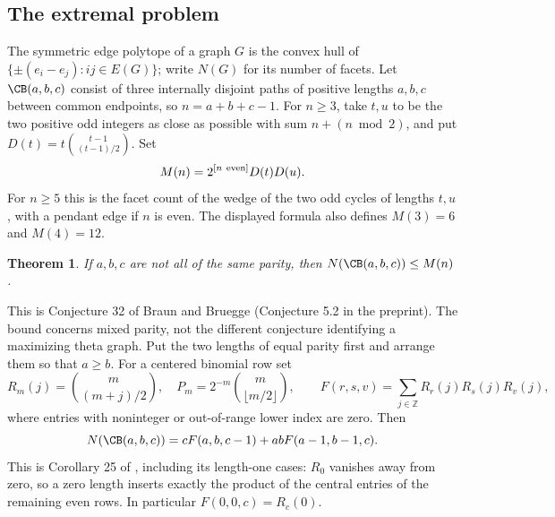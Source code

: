\documentclass[11pt,a4paper]{article}
\numberwithin{equation}{section}
\newtheorem{theorem}{Theorem}[section]
\theoremstyle{definition}
\theoremstyle{remark}
\begin{document}
\subsection{The extremal problem}
The symmetric edge polytope of a graph $G$ is the convex hull of
$\{\pm(e_i-e_j):ij\in E(G)\}$; write $N(G)$ for its number of facets.
Let $\CB(a,b,c)$ consist of three internally disjoint paths of positive lengths
$a,b,c$ between common endpoints, so $n=a+b+c-1$.
For $n\ge3$, take $t,u$ to be the two positive odd integers as close as
possible with sum $n+(n\bmod 2)$, and put $D(t)=t\binom{t-1}{(t-1)/2}$. Set
\[
 M(n)=2^{[n\ {\rm even}]}D(t)D(u).
\]
For $n\ge5$ this is the facet count of the wedge of the two odd cycles of
lengths $t,u$, with a pendant edge if $n$ is even. The displayed formula
also defines $M(3)=6$ and $M(4)=12$.
\begin{theorem}\label{r27showa:th}
If $a,b,c$ are not all of the same parity, then
$N(\CB(a,b,c))\le M(n)$.
\end{theorem}
This is Conjecture 32 of Braun and Bruegge \cite{r27showa:BB} (Conjecture 5.2 in
the preprint). The bound concerns mixed parity, not the different conjecture
identifying a maximizing theta graph. Put the two lengths of equal parity
first and arrange them so that $a\ge b$. For a centered binomial row set
\[
 R_m(j)=\binom m{(m+j)/2},\quad P_m=2^{-m}\binom m{\lfloor m/2\rfloor},
 \qquad F(r,s,v)=\sum_{j\in\mathbb Z}R_r(j)R_s(j)R_v(j),
\]
where entries with noninteger or out-of-range lower index are zero. Then
\begin{equation}\label{r27showa:count}
 N(\CB(a,b,c))=c F(a,b,c-1)+ab F(a-1,b-1,c).
\end{equation}
This is Corollary 25 of \cite{r27showa:BB}, including its length-one cases: $R_0$
vanishes away from zero, so a zero length inserts exactly the product of the
central entries of the remaining even rows. In particular $F(0,0,c)=R_c(0)$.
\end{document}
